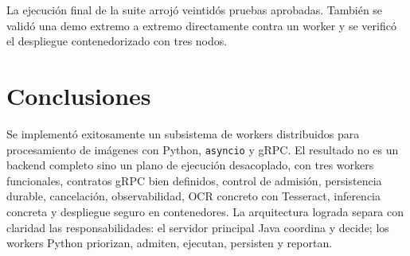 \documentclass[conference]{IEEEtran}
\begin{document}
La ejecución final de la suite arrojó veintidós pruebas aprobadas. También se validó una demo extremo a extremo directamente contra un worker y se verificó el despliegue contenedorizado con tres nodos.

\section{Conclusiones}
Se implementó exitosamente un subsistema de workers distribuidos para procesamiento de imágenes con Python, \texttt{asyncio} y gRPC. El resultado no es un backend completo sino un plano de ejecución desacoplado, con tres workers funcionales, contratos gRPC bien definidos, control de admisión, persistencia durable, cancelación, observabilidad, OCR concreto con Tesseract, inferencia concreta y despliegue seguro en contenedores. La arquitectura lograda separa con claridad las responsabilidades: el servidor principal Java coordina y decide; los workers Python priorizan, admiten, ejecutan, persisten y reportan.
\end{document}
